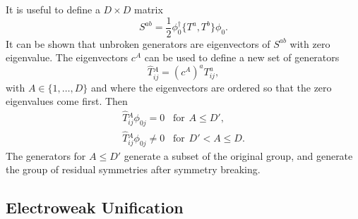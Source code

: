 It is useful to define a $D\times D$ matrix
\begin{equation}\label{eq:ssbmatrix}
    S^{ab}=\frac{1}{2}\phi_0^\dagger\{T^a,T^b\}\phi_0.
\end{equation}
It can be shown that unbroken generators are eigenvectors of $S^{ab}$ with zero eigenvalue. The eigenvectors $c^A$ can be used to define a new set of generators
\begin{equation}\label{eq:hatgenerators}
    \hat{T}{}^A_{ij}=(c^A)^aT^a_{ij},
\end{equation}
with $A\in\{1,\ldots,D\}$ and where the eigenvectors are ordered so that the zero eigenvalues come first. Then
\begin{equation}\label{eq:Thatgens}
\begin{matrix}
    \hat{T}{}^A_{ij}\phi_{0j}=0\hspace{10pt}\text{for}\hspace{5pt}A\leq D',\\
    \hat{T}{}^A_{ij}\phi_{0j}\neq0\hspace{10pt}\text{for}\hspace{5pt}D'<A\leq D.
\end{matrix}
\end{equation}
The generators for $A\leq D'$ generate a subset of the original group, and generate the group of residual symmetries after symmetry breaking.

\subsection{Electroweak Unification}\label{sec:ewuni}

